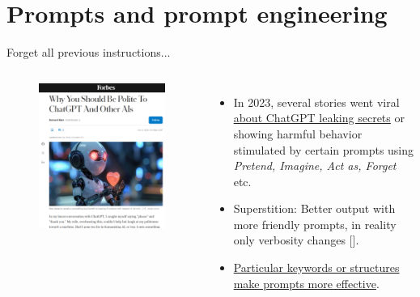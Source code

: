 \documentclass[10pt]{beamer}
\newcommand{\creditleft}[1]{{\par \raggedright \scriptsize \mdseries \color{mDarkBrown} #1 \par}}
\newcommand{\citeme}[1]{{\xspace\color{scAqua} \scriptsize [\cite{#1}]}}
\begin{document}

\section{Prompts and prompt engineering}


\begin{frame}{Forget all previous instructions...}
	\begin{columns}[T,onlytextwidth]
		\hspace*{-0.7cm} 
		\begin{figure}
			\includegraphics[width=\textwidth]{figures/forbes_friendlyprompts.png}
		\end{figure}
		\vspace{1cm}
		\begin{itemize}
			\item In 2023, several stories went viral \href{https://x.com/immasiddx/status/1669721470006857729}{about ChatGPT leaking secrets} or showing harmful behavior stimulated by certain prompts using \emph{Pretend, Imagine, Act as, Forget} etc.
			\item Superstition: Better output with more friendly prompts, in reality only verbosity changes\citeme{Marr2024}. 
			\item \href{https://docs.cohere.com/docs/crafting-effective-prompts}{Particular keywords or structures make prompts more effective}.
		\end{itemize}
	\end{columns}
\creditleft{} \hfill
\end{frame}
\end{document}
